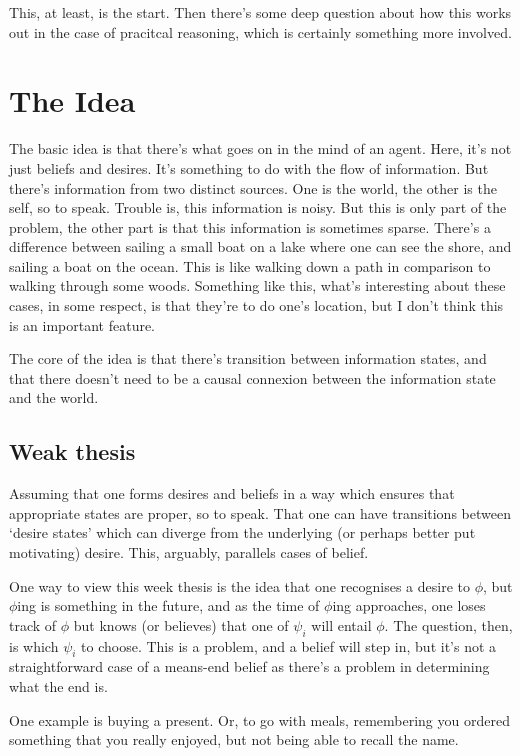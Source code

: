 \documentclass[10pt]{article}
\begin{document}
This, at least, is the start.
Then there's some deep question about how this works out in the case of pracitcal reasoning, which is certainly something more involved.

\section{The Idea}
\label{sec:idea}

The basic idea is that there's what goes on in the mind of an agent.
Here, it's not just beliefs and desires.
It's something to do with the flow of information.
But there's information from two distinct sources.
One is the world, the other is the self, so to speak.
Trouble is, this information is noisy.
But this is only part of the problem, the other part is that this information is sometimes sparse.
There's a difference between sailing a small boat on a lake where one can see the shore, and sailing a boat on the ocean.
This is like walking down a path in comparison to walking through some woods.
Something like this, what's interesting about these cases, in some respect, is that they're to do one's location, but I don't think this is an important feature.


The core of the idea is that there's transition between information states, and that there doesn't need to be a causal connexion between the information state and the world.


\subsection{Weak thesis}
\label{sec:weak-thesis}

Assuming that one forms desires and beliefs in a way which ensures that appropriate states are proper, so to speak.
That one can have transitions between `desire states' which can diverge from the underlying (or perhaps better put motivating) desire.
This, arguably, parallels cases of belief.

One way to view this week thesis is the idea that one recognises a desire to \(\phi\), but \(\phi\)ing is something in the future, and as the time of \(\phi\)ing approaches, one loses track of \(\phi\) but knows (or believes) that one of \(\psi_{i}\) will entail \(\phi\).
The question, then, is which \(\psi_{i}\) to choose.
This is a problem, and a belief will step in, but it's not a straightforward case of a means-end belief as there's a problem in determining what the end is.

One example is buying a present.
Or, to go with meals, remembering you ordered something that you really enjoyed, but not being able to recall the name.
\end{document}
